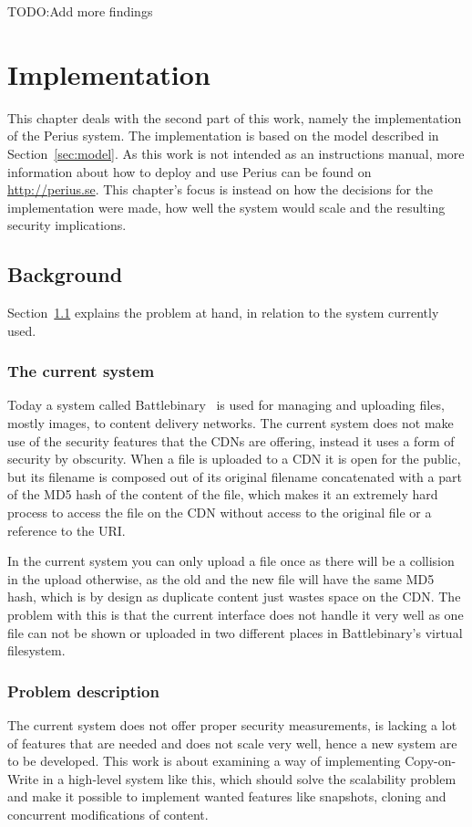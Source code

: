 \documentclass[a4paper,12pt]{article}
\newcommand{\fix}{\colorbox{yellow!30}{TODO:}}
\begin{document}
\fix Add more findings
\newpage 
\section{Implementation} \label{sec:implementation} 
This chapter deals with the second part of this work, namely the implementation of the Perius
system. The implementation is based on the model described in Section~\ref{sec:model}. As this work
is not intended as an instructions manual, more information about how to deploy and use Perius can
be found on \url{http://perius.se}. This chapter's focus is instead on how the decisions for the
implementation were made, how well the system would scale and the resulting security implications.

\subsection{Background} \label{sec:background}
Section~\ref{sec:background} explains the problem at hand, in relation to the system currently 
used.

\subsubsection{The current system} \label{sec:current_system}
Today a system called Battlebinary~\cite{BATTLEBINARY} is used for managing and uploading files,
mostly images, to content delivery networks. The current system does not make use of the
security features that the CDNs are offering, instead it uses a form of security by obscurity. When
a file is uploaded to a CDN it is open for the public, but its filename is composed out of its
original filename concatenated with a part of the MD5 hash of the content of the file, which makes
it an extremely hard process to access the file on the CDN without access to the original file or a
reference to the URI.

In the current system you can only upload a file once as there will be a collision in the upload
otherwise, as the old and the new file will have the same MD5 hash, which is by design as duplicate
content just wastes space on the CDN. The problem with this is that the current interface does not
handle it very well as one file can not be shown or uploaded in two different places in 
Battlebinary's virtual filesystem.

\subsubsection{Problem description}
The current system does not offer proper security measurements, is lacking a lot of features that
are needed and does not scale very well, hence a new system are to be developed. This work is about
examining a way of implementing Copy-on-Write in a high-level system like this, which should solve
the scalability problem and make it possible to implement wanted features like snapshots, cloning
and concurrent modifications of content.
\end{document}
